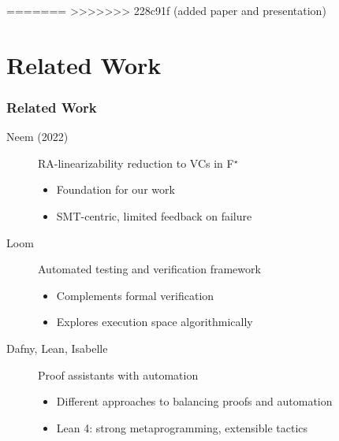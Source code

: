 \documentclass[usepdftitle=false]{beamer}
\newcommand{\fstar}{F$^{\star}$\xspace}
\begin{document}
=======
>>>>>>> 228c91f (added paper and presentation)
\section{Related Work}

\begin{frame}
  \frametitle{Related Work}
  
  \begin{description}
    \item[Neem (2022)] RA-linearizability reduction to VCs in \fstar
      \begin{itemize}
        \item Foundation for our work
        \item SMT-centric, limited feedback on failure
      \end{itemize}
    
    \item[Loom] Automated testing and verification framework
      \begin{itemize}
        \item Complements formal verification
        \item Explores execution space algorithmically
      \end{itemize}
    
    \item[Dafny, Lean, Isabelle] Proof assistants with automation
      \begin{itemize}
        \item Different approaches to balancing proofs and automation
        \item Lean 4: strong metaprogramming, extensible tactics
      \end{itemize}
  \end{description}
\end{frame}
\end{document}
